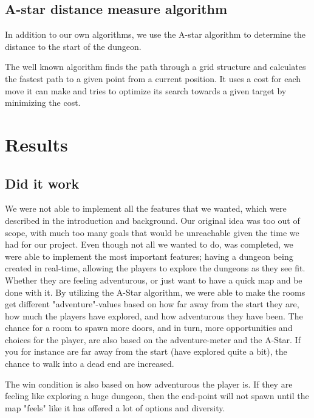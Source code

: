 \documentclass[conference,compsoc]{IEEEtran}
\begin{document}
\subsection{A-star distance measure algorithm}
\label{sec:astar}
In addition to our own algorithms, we use the A-star algorithm to determine the distance to the start of the dungeon. 

The well known algorithm finds the path through a grid structure and calculates the fastest path to a given point from a current position. It uses a cost for each move it can make and tries to optimize its search towards a given target by minimizing the cost.

\section{Results}
\subsection{Did it work}
We were not able to implement all the features that we wanted, which were described in the introduction and background. Our original idea was too out of scope, with much too many goals that would be unreachable given the time we had for our project. Even though not all we wanted to do, was completed, we were able to implement the most important features; having a dungeon being created in real-time, allowing the players to explore the dungeons as they see fit. Whether they are feeling adventurous, or just want to have a quick map and be done with it. 
By utilizing the A-Star algorithm, we were able to make the rooms get different "adventure"-values based on how far away from the start they are, how much the players have explored, and how adventurous they have been. The chance for a room to spawn more doors, and in turn, more opportunities and choices for the player, are also based on the adventure-meter and the A-Star. If you for instance are far away from the start (have explored quite a bit), the chance to walk into a dead end are increased.

The win condition is also based on how adventurous the player is. If they are feeling like exploring a huge dungeon, then the end-point will not spawn until the map "feels" like it has offered a lot of options and diversity.
\end{document}

